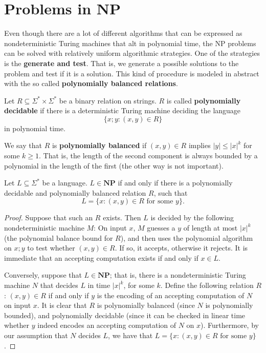 \documentclass[12pt]{article}
\begin{document}
\newpage
\section{Problems in NP}
Even though there are a lot of different algorithms that can be expressed as nondeterministic Turing machines that alt in polynomial time, the NP problems can be solved with relatively uniform algorithmic strategies. One of the strategies is the \textbf{generate and test}. That is, we generate a possible solutions to the problem and test if it is a solution. This kind of procedure is modeled in abstract with the so called \textbf{polynomially balanced relations}.
\begin{defbox}
Let $R \subseteq \Sigma^* \times \Sigma^*$ be a binary relation on strings. $R$ is called \textbf{polynomially decidable} if there is a deterministic Turing machine deciding the language 
\[
\{x; y : (x, y) \in R\}
\]
in polynomial time. 
\end{defbox}
\begin{defbox}
  We say that $R$ is \textbf{polynomially balanced} if $(x, y) \in R$ implies $|y| \leq |x|^k$ for some $k \geq 1$. That is, the length of the second component is always bounded by a polynomial in the length of the first (the other way is not important).
\end{defbox}
\begin{defbox}[\textcolor{red}{Proposition 9.1}]
  Let $L \subseteq \Sigma^*$ be a language. $L \in \textbf{NP}$ if and only if there is a polynomially decidable and polynomially balanced relation $R$, such that 
\[
L = \{x : (x, y) \in R \text{ for some } y\}.
\]
\end{defbox}
\begin{proof}
  Suppose that such an $R$ exists. Then $L$ is decided by the following nondeterministic machine $M$: On input $x$, $M$ guesses a $y$ of length at most $|x|^k$ (the polynomial balance bound for $R$), and then uses the polynomial algorithm on $x; y$ to test whether $(x, y) \in R$. If so, it accepts, otherwise it rejects. It is immediate that an accepting computation exists if and only if $x \in L$.

Conversely, suppose that $L \in \textbf{NP}$; that is, there is a nondeterministic Turing machine $N$ that decides $L$ in time $|x|^k$, for some $k$. Define the following relation $R$: $(x, y) \in R$ if and only if $y$ is the encoding of an accepting computation of $N$ on input $x$. It is clear that $R$ is polynomially balanced (since $N$ is polynomially bounded), and polynomially decidable (since it can be checked in linear time whether $y$ indeed encodes an accepting computation of $N$ on $x$). Furthermore, by our assumption that $N$ decides $L$, we have that $L = \{x : (x, y) \in R \text{ for some } y\}$.
\end{proof}
\end{document}
